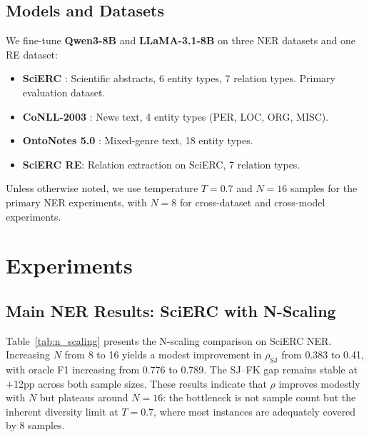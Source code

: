 \documentclass[11pt]{article}
\begin{document}
\subsection{Models and Datasets}

We fine-tune \textbf{Qwen3-8B} and \textbf{LLaMA-3.1-8B} on three NER datasets and one RE dataset:
\begin{itemize}
  \item \textbf{SciERC} \citep{luan2018multi}: Scientific abstracts, 6 entity types, 7 relation types. Primary evaluation dataset.
  \item \textbf{CoNLL-2003} \citep{tjong2003introduction}: News text, 4 entity types (PER, LOC, ORG, MISC).
  \item \textbf{OntoNotes 5.0} \citep{pradhan2013towards}: Mixed-genre text, 18 entity types.
  \item \textbf{SciERC RE}: Relation extraction on SciERC, 7 relation types.
\end{itemize}

Unless otherwise noted, we use temperature $T{=}0.7$ and $N{=}16$ samples for the primary NER experiments, with $N{=}8$ for cross-dataset and cross-model experiments.

\section{Experiments}

\subsection{Main NER Results: SciERC with N-Scaling}
\label{sec:main_ner}

Table~\ref{tab:n_scaling} presents the N-scaling comparison on SciERC NER.
Increasing $N$ from 8 to 16 yields a modest improvement in $\rho_{\text{SJ}}$ from 0.383 to 0.41, with oracle F1 increasing from 0.776 to 0.789.
The SJ--FK gap remains stable at $+$12pp across both sample sizes.
These results indicate that $\rho$ improves modestly with $N$ but plateaus around $N{=}16$: the bottleneck is not sample count but the inherent diversity limit at $T{=}0.7$, where most instances are adequately covered by 8 samples.
\end{document}
